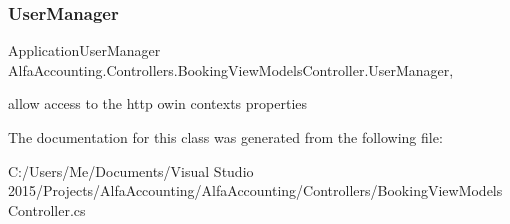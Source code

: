 \subsubsection{\texorpdfstring{User\+Manager}{UserManager}}
{\footnotesize\ttfamily Application\+User\+Manager Alfa\+Accounting.\+Controllers.\+Booking\+View\+Models\+Controller.\+User\+Manager\hspace{0.3cm}{\ttfamily [get]}, {}}



allow access to the http owin context\textquotesingle{}s properties 



The documentation for this class was generated from the following file\+:\begin{DoxyCompactItemize}
\item 
C\+:/\+Users/\+Me/\+Documents/\+Visual Studio 2015/\+Projects/\+Alfa\+Accounting/\+Alfa\+Accounting/\+Controllers/Booking\+View\+Models\+Controller.\+cs\end{DoxyCompactItemize}
